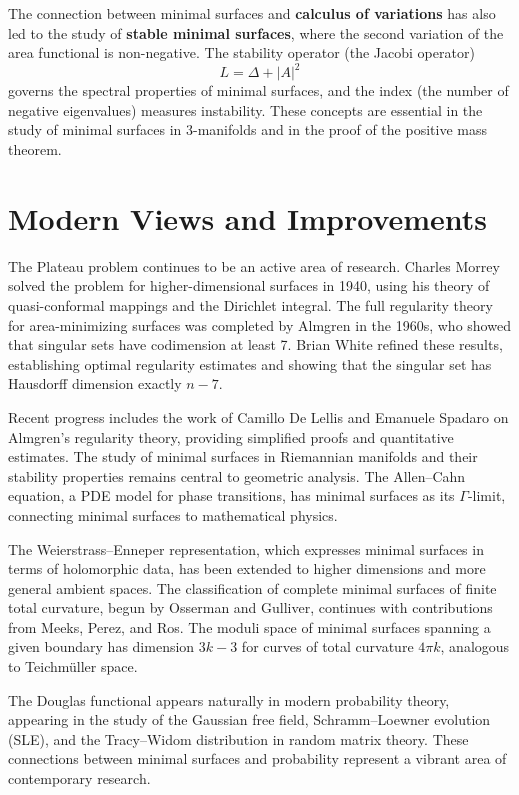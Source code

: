 The connection between minimal surfaces and \textbf{calculus of
variations} has also led to the study of \textbf{stable minimal
surfaces}, where the second variation of the area functional is
non-negative. The stability operator (the Jacobi operator)
\[
L = \Delta + |A|^2
\]
governs the spectral properties of minimal surfaces, and the index
(the number of negative eigenvalues) measures instability. These
concepts are essential in the study of minimal surfaces in 3-manifolds
and in the proof of the positive mass theorem.

\section{Modern Views and Improvements}

The Plateau problem continues to be an active area of research. Charles
Morrey solved the problem for higher-dimensional surfaces in 1940, using
his theory of quasi-conformal mappings and the Dirichlet integral. The
full regularity theory for area-minimizing surfaces was completed by
Almgren in the 1960s, who showed that singular sets have codimension at
least 7. Brian White refined these results, establishing optimal
regularity estimates and showing that the singular set has Hausdorff
dimension exactly $n-7$.

Recent progress includes the work of Camillo De Lellis and Emanuele
Spadaro on Almgren's regularity theory, providing simplified proofs and
quantitative estimates. The study of minimal surfaces in Riemannian
manifolds and their stability properties remains central to geometric
analysis. The Allen--Cahn equation, a PDE model for phase transitions,
has minimal surfaces as its $\Gamma$-limit, connecting minimal surfaces
to mathematical physics.

The Weierstrass--Enneper representation, which expresses minimal
surfaces in terms of holomorphic data, has been extended to higher
dimensions and more general ambient spaces. The classification of
complete minimal surfaces of finite total curvature, begun by Osserman
and Gulliver, continues with contributions from Meeks, Perez, and Ros.
The moduli space of minimal surfaces spanning a given boundary has
dimension $3k - 3$ for curves of total curvature $4\pi k$, analogous to
Teichm\"{u}ller space.

The Douglas functional appears naturally in modern probability theory,
appearing in the study of the Gaussian free field, Schramm--Loewner
evolution (SLE), and the Tracy--Widom distribution in random matrix
theory. These connections between minimal surfaces and probability
represent a vibrant area of contemporary research.

